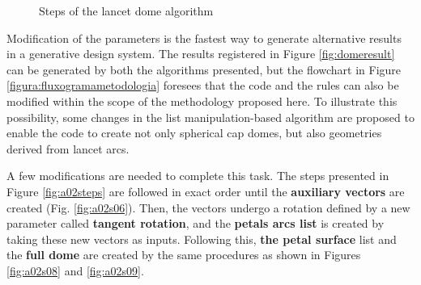 \documentclass[preprint,12pt,3p]{elsarticle}
\begin{document}
\begin{figure}[h]
\caption{Steps of the lancet dome algorithm}
\label{fig:lancetdome}
\end{figure}

Modification of the parameters is the fastest way to generate alternative results in a generative design system. The results registered in Figure \ref{fig:domeresult} can be generated by both the algorithms presented, but the flowchart in Figure \ref{figura:fluxogramametodologia} foresees that the code and the rules can also be modified within the scope of the methodology proposed here. To illustrate this possibility, some changes in the list manipulation-based algorithm are proposed to enable the code to create not only spherical cap domes, but also geometries derived from lancet arcs.

A few modifications are needed to complete this task. The steps presented in Figure \ref{fig:a02steps} are followed in exact order until the \textbf{auxiliary vectors} are created (Fig. \ref{fig:a02s06}). Then, the vectors undergo a rotation defined by a new parameter called \textbf{tangent rotation}, and the \textbf{petals arcs list} is created by taking these new vectors as inputs. Following this,\textbf{ the petal surface} list and the \textbf{full dome} are created by the same procedures as shown in Figures \ref{fig:a02s08} and \ref{fig:a02s09}.
\end{document}
